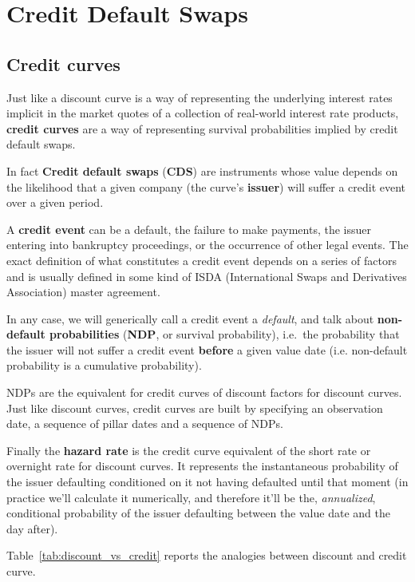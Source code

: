 \chapter{Credit Default Swaps}\label{credit_default_swaps}

\section{Credit curves}\label{credit-curves}

Just like a discount curve is a way of representing the underlying
interest rates implicit in the market quotes of a collection of
real-world interest rate products, \textbf{credit curves} are a way of
representing survival probabilities implied by credit default swaps.

In fact \textbf{Credit default swaps} (\textbf{CDS}) are instruments whose value
depends on the likelihood that a given company (the curve's
\textbf{issuer}) will suffer a credit event over a given period.

A \textbf{credit event} can be a default, the failure to make payments,
the issuer entering into bankruptcy proceedings, or the occurrence of
other legal events. The exact definition of what constitutes a credit
event depends on a series of factors and is usually defined in some kind
of ISDA (International Swaps and Derivatives Association) master
agreement.

In any case, we will generically call a credit event a \emph{default},
and talk about \textbf{non-default probabilities} (\textbf{NDP}, or
survival probability), i.e.~the probability that the issuer will
not suffer a credit event \textbf{before} a given value date (i.e. non-default probability is a cumulative probability).

NDPs are the equivalent for credit curves of discount factors for
discount curves. Just like discount curves, credit curves are built by
specifying an observation date, a sequence of pillar dates and a
sequence of NDPs. 

Finally the \textbf{hazard rate} is the credit curve
equivalent of the short rate or overnight rate for discount curves. It
represents the instantaneous probability of the issuer defaulting
conditioned on it not having defaulted until that moment (in
practice we'll calculate it numerically, and therefore it'll be the, \emph{annualized}, conditional probability of the issuer defaulting between
the value date and the day after).

Table~\ref{tab:discount_vs_credit} reports the analogies between discount
and credit curve.

